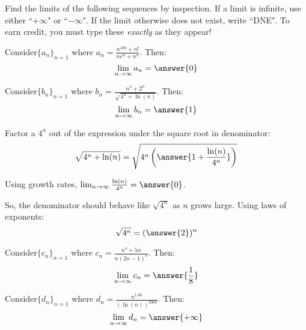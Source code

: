 \documentclass{ximera}
\author{Jim Talamo}
\begin{document}
\begin{exercise}

Find the limits of the following sequences by inspection.  If a limit is infinite, use either ``$+\infty$" or ``$-\infty$".  If the limit otherwise does not exist, write ``DNE".  To earn credit, you must type these \emph{exactly} as they appear!

\begin{exercise}
Consider$\{a_n \}_{n=1}$ where $a_n = \frac{n^{100}+n!}{ne^n+n^n}$.  Then:
\[
\lim_{n \to \infty} a_n = \answer{0}
\]
\end{exercise}

\begin{exercise}
Consider$\{b_n \}_{n=1}$ where $b_n = \frac{n^2+2^n}{\sqrt{4^n+\ln(n)}}$.  Then:
\[
\lim_{n \to \infty} b_n = \answer{1}
\]
\begin{hint}
Factor a $4^n$ out of the expression under the square root in denominator:
\[
\sqrt{4^n+\ln(n)} = \sqrt{4^n \left(\answer{1+ \frac{\ln(n)}{4^n}}\right)}
\]

\begin{question}
Using growth rates, $\lim_{n \to \infty} \frac{\ln(n)}{4^n} = \answer{0}$.

\begin{question}
So, the denominator should behave like $\sqrt{4^n}$ as $n$ grows large. Using laws of exponents:
\[
\sqrt{4^n} = (\answer{2})^n
\]
\end{question}
\end{question}
\end{hint}

\end{exercise}

\begin{exercise}
Consider$\{c_n \}_{n=1}$ where $c_n = \frac{n^4+5n}{n(2n-1)^3}$.  Then:
\[
\lim_{n \to \infty} c_n = \answer{\frac{1}{8}}
\]
\end{exercise}

\begin{exercise}
Consider$\{d_n \}_{n=1}$ where $d_n = \frac{n^{1.06}}{(\ln(n))^{2000}}$.  Then:
\[
\lim_{n \to \infty} d_n =  \answer{+\infty}
\]
\end{exercise}


\end{exercise}
\end{document}
